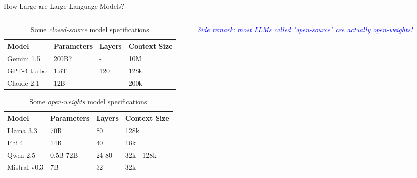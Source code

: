 \documentclass[11pt,aspectratio=169]{beamer}
\begin{document}
\begin{frame}{How Large are Large Language Models?}
    \begin{columns}
        \begin{column}{0.6\linewidth}
            \vspace{-0.1cm}
            \begin{table}[]
                \begin{tabular}{@{}llll@{}}
                    \toprule
                    Model       & Parameters & Layers & Context Size  \\ \midrule
                    Gemini 1.5  & 200B?      & -      & 10M  \\
                    GPT-4 turbo & 1.8T       & 120    & 128k            \\
                    Claude 2.1  & 12B        & -      & 200k            \\ \bottomrule
                \end{tabular}
                \caption{\centering Some \textsl{closed-source} model specifications}
            \end{table}
            \vspace{-0.4cm}
            \begin{table}[]
                \begin{tabular}{@{}llll@{}}
                \toprule
                Model        & Parameters & Layers & Context Size \\ \midrule
                Llama 3.3    & 70B        & 80     & 128k           \\
                Phi 4        & 14B        & 40     & 16k            \\
                Qwen 2.5     & 0.5B-72B   & 24-80  & 32k - 128k     \\
                Mistral-v0.3 & 7B         & 32     & 32k            \\ \bottomrule
                \end{tabular}
                \caption{\centering Some \textsl{open-weights} model specifications}
            \end{table}
        \end{column}
        \begin{column}{0.4\linewidth}
            \vspace*{-0.5cm}
            \begin{center}
            \textcolor{blue}{\sl Side remark: most LLMs called "open-source" are actually open-weights!}
            \end{center}

\end{column}
\end{columns}
\end{frame}
\end{document}
